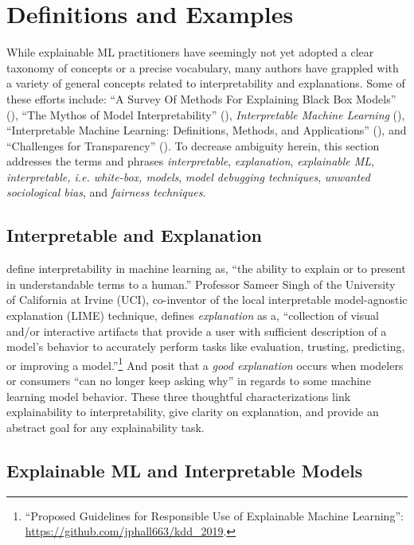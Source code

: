 \documentclass{article}
\begin{document}
\section{Definitions and Examples} \label{sec:intro}

While explainable ML practitioners have seemingly not yet adopted a clear taxonomy of concepts or a precise vocabulary, many authors have grappled with a variety of general concepts related to interpretability and explanations. Some of these efforts include: ``A Survey Of Methods For Explaining Black Box Models'' (\citet{guidotti2018survey}), ``The Mythos of Model Interpretability'' (\citet{lipton1}), \textit{Interpretable Machine Learning} (\citet{molnar}), ``Interpretable Machine Learning: Definitions,
Methods, and Applications'' (\citet{murdoch2019interpretable}), and ``Challenges for Transparency'' (\citet{weller2017challenges}). To decrease ambiguity herein, this section addresses the terms and phrases \textit{interpretable}, \textit{explanation}, \textit{explainable ML}, \textit{interpretable, i.e. white-box, models}, \textit{model debugging techniques}, \textit{unwanted sociological bias}, and \textit{fairness techniques}.

\subsection{Interpretable and Explanation}

\citet{been_kim1} define interpretability in machine learning as, ``the ability to explain or to present in understandable terms to a human.'' Professor Sameer Singh of the University of California at Irvine (UCI), co-inventor of the local interpretable model-agnostic explanation (LIME) technique, defines \textit{explanation} as a, ``collection of visual and/or interactive artifacts that provide a user with sufficient description of a model's behavior to accurately perform tasks like evaluation, trusting, predicting, or improving a model.''\footnote{``Proposed Guidelines for Responsible Use of Explainable Machine Learning'': \url{https://github.com/jphall663/kdd_2019}.} And \citet{gilpin2018explaining} posit that a \textit{good explanation} occurs when modelers or consumers ``can no longer keep asking why'' in regards to some machine learning model behavior. These three thoughtful characterizations link explainability to interpretability, give clarity on explanation, and provide an abstract goal for any explainability task.

\subsection{Explainable ML and Interpretable Models }
\end{document}
